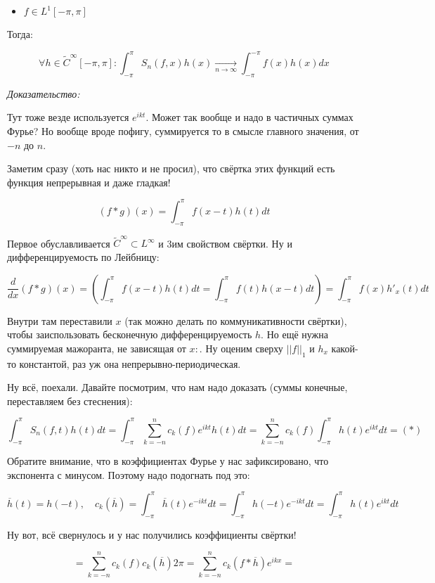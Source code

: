 \documentclass{article}
\def\goesto#1{\underset{#1}{\longrightarrow}}
\def\toinf#1{\goesto{#1 \rightarrow \infty}}
\def\ntoinf{\toinf{n}}
\begin{document}
\begin{itemize}
    \item $f \in L^1[-\pi, \pi]$
\end{itemize}

Тогда:

\[\forall h \in \tilde{C}^{\infty}[-\pi, \pi]: \int_{-\pi}^{\pi} S_n(f, x)h(x) \ntoinf \int_{-\pi}^{-\pi} f(x)h(x)dx\]

\textit{Доказательство:}

Тут тоже везде используется $e^{ikt}$. Может так вообще и надо в частичных суммах Фурье? Но вообще вроде пофигу, суммируется то в смысле главного значения, от $-n$ до $n$.


Заметим сразу (хоть нас никто и не просил), что свёртка этих функций есть функция непрерывная и даже гладкая!

\[(f * g)(x) = \int_{-\pi}^{\pi} f(x - t)h(t) dt\]

Первое обуславливается $\tilde{C}^{\infty} \subset L^{\infty}$ и 3им свойством свёртки. Ну и дифференцируемость по Лейбницу:

\[\frac{d}{dx}(f * g)(x) = \left( \int_{-\pi}^{\pi} f(x - t)h(t) dt =  \int_{-\pi}^{\pi} f(t)h(x - t) dt\right) =  \int_{-\pi}^{\pi} f(x)h'_x(t) dt\]

Внутри там переставили $x$ (так можно делать по коммуникативности свёртки), чтобы заиспользовать бесконечную дифференцируемость $h$. Но ещё нужна суммируемая мажоранта, не зависящая от $x:$. Ну оценим сверху $||f||_1$ и $h_x$ какой-то константой, раз уж она непрерывно-периодическая.

Ну всё, поехали. Давайте посмотрим, что нам надо доказать (суммы конечные, переставляем без стеснения):

\[\int_{-\pi}^{\pi} S_n(f, t) h(t) dt = \int_{-\pi}^{\pi} \sum_{k = -n}^{n} c_k(f)  e^{ikt} h(t) dt = \sum_{k = -n}^{n}c_k(f)\int_{-\pi}^{\pi}h(t) e^{ikt}dt = (*)\]

Обратите внимание, что в коэффициентах Фурье у нас зафиксировано, что экспонента с минусом.  Поэтому надо подогнать под это:

\[\overline{h}(t) = h(-t), \quad c_k(\overline{h}) = \int_{-\pi}^{\pi} \overline{h}(t) e^{-ikt} dt = \int_{-\pi}^{\pi} h(-t)e^{-ikt} dt = \int_{-\pi}^{\pi} h(t) e^{ikt} dt\]

Ну вот, всё свернулось и у нас получились коэффициенты свёртки!

\[= \sum_{k = -n}^{n} c_k(f)c_k(\overline{h})2 \pi = \sum_{k  =-n}^{n} c_k(f * \overline{h}) e^{ikx} = \]
\end{document}
